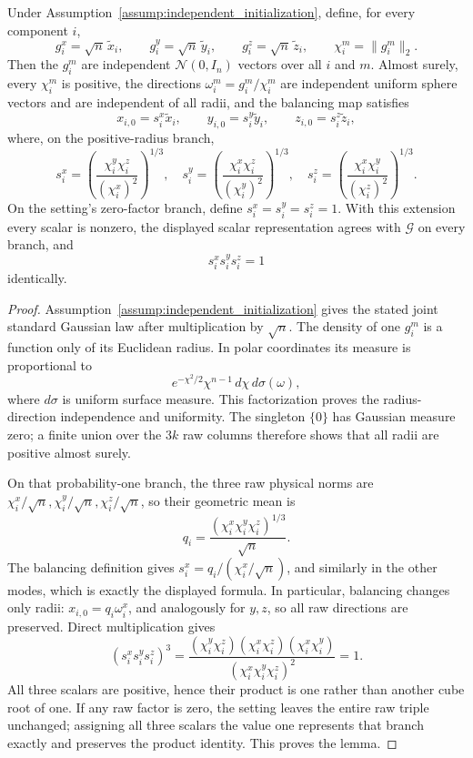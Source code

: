 \begin{lemma}
\label{lem:step-002-balancing-scalars}
Under Assumption~\ref{assump:independent_initialization}, define, for every
component \(i\),
\[
  g_i^x=\sqrt n\,\widetilde x_i,
  \qquad g_i^y=\sqrt n\,\widetilde y_i,
  \qquad g_i^z=\sqrt n\,\widetilde z_i,
  \qquad \chi_i^m=\|g_i^m\|_2.
\]
Then the \(g_i^m\) are independent \(\mathcal N(0,I_n)\) vectors over all
\(i\) and \(m\). Almost surely, every \(\chi_i^m\) is positive, the directions
\(\omega_i^m=g_i^m/\chi_i^m\) are independent uniform sphere vectors and are
independent of all radii, and the balancing map satisfies
\[
  x_{i,0}=s_i^x\widetilde x_i,\qquad
  y_{i,0}=s_i^y\widetilde y_i,\qquad
  z_{i,0}=s_i^z\widetilde z_i,
\]
where, on the positive-radius branch,
\[
  s_i^x=\left(\frac{\chi_i^y\chi_i^z}{(\chi_i^x)^2}\right)^{1/3},
  \quad
  s_i^y=\left(\frac{\chi_i^x\chi_i^z}{(\chi_i^y)^2}\right)^{1/3},
  \quad
  s_i^z=\left(\frac{\chi_i^x\chi_i^y}{(\chi_i^z)^2}\right)^{1/3}.
\]
On the setting's zero-factor branch, define
\(s_i^x=s_i^y=s_i^z=1\). With this extension every scalar is nonzero, the
displayed scalar representation agrees with \(\mathcal G\) on every branch,
and
\[
  s_i^x s_i^y s_i^z=1
\]
identically.

\end{lemma}

\begin{proof}
Assumption~\ref{assump:independent_initialization}
gives the stated joint standard Gaussian law after multiplication by
\(\sqrt n\). The density of one \(g_i^m\) is a function only of its Euclidean
radius. In polar coordinates its measure is proportional to
\[
  e^{-\chi^2/2}\chi^{n-1}\,d\chi\,d\sigma(\omega),
\]
where \(d\sigma\) is uniform surface measure. This factorization proves the
radius-direction independence and uniformity. The singleton \(\{0\}\) has
Gaussian measure zero; a finite union over the \(3k\) raw columns therefore
shows that all radii are positive almost surely.

On that probability-one branch, the three raw physical norms are
\(\chi_i^x/\sqrt n,\chi_i^y/\sqrt n,\chi_i^z/\sqrt n\), so their geometric
mean is
\[
  q_i=\frac{(\chi_i^x\chi_i^y\chi_i^z)^{1/3}}{\sqrt n}.
\]
The balancing definition gives
\(s_i^x=q_i/(\chi_i^x/\sqrt n)\), and similarly in the other modes, which is
exactly the displayed formula. In particular, balancing changes only radii:
\(x_{i,0}=q_i\omega_i^x\), and analogously for \(y,z\), so all raw directions
are preserved. Direct multiplication gives
\[
  (s_i^x s_i^y s_i^z)^3
  =\frac{(\chi_i^y\chi_i^z)(\chi_i^x\chi_i^z)
          (\chi_i^x\chi_i^y)}
         {(\chi_i^x\chi_i^y\chi_i^z)^2}
  =1.
\]
All three scalars are positive, hence their product is one rather than another
cube root of one. If any raw factor is zero, the setting leaves the entire raw
triple unchanged; assigning all three scalars the value one represents that
branch exactly and preserves the product identity. This proves the lemma.


\end{proof}



